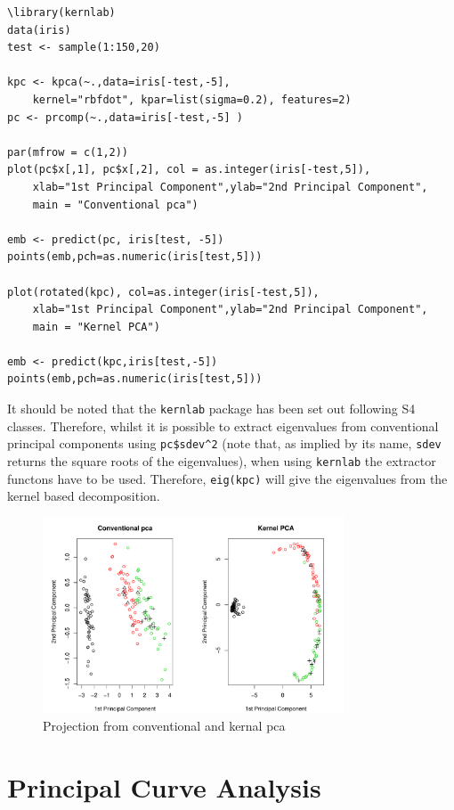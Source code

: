 \begin{verbatim}
\library(kernlab)
data(iris)
test <- sample(1:150,20)

kpc <- kpca(~.,data=iris[-test,-5],
    kernel="rbfdot", kpar=list(sigma=0.2), features=2)
pc <- prcomp(~.,data=iris[-test,-5] )

par(mfrow = c(1,2))
plot(pc$x[,1], pc$x[,2], col = as.integer(iris[-test,5]), 
    xlab="1st Principal Component",ylab="2nd Principal Component",
    main = "Conventional pca")

emb <- predict(pc, iris[test, -5])
points(emb,pch=as.numeric(iris[test,5]))

plot(rotated(kpc), col=as.integer(iris[-test,5]),
    xlab="1st Principal Component",ylab="2nd Principal Component",
    main = "Kernel PCA")

emb <- predict(kpc,iris[test,-5])
points(emb,pch=as.numeric(iris[test,5]))
\end{verbatim}

It should be noted that the \verb+kernlab+ package has been set out following S4 classes.   Therefore, whilst it is possible to extract eigenvalues from conventional principal components using \verb+pc$sdev^2+ (note that, as implied by its name, \verb+sdev+ returns the square roots of the eigenvalues), when using \verb+kernlab+ the extractor functons have to be used.   Therefore, \verb+eig(kpc)+ will give the eigenvalues from the kernel based decomposition.

\begin{figure}
\begin{center}
\includegraphics[width = 0.8\textwidth]{images/kernelpca}
\caption{Projection from conventional and kernal pca}
\label{kernpca}
\end{center}
\end{figure}


\section{Principal Curve Analysis}

